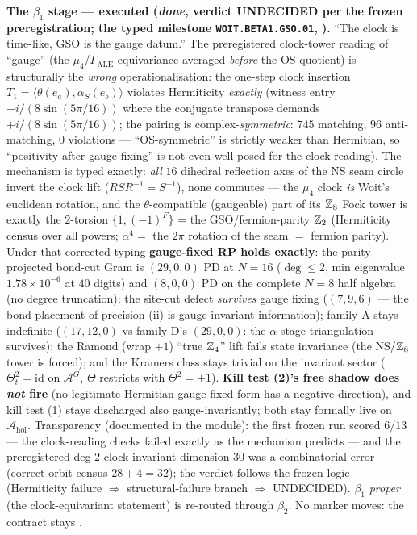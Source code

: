 \par\smallskip\noindent\textbf{The $\beta_1$ stage --- executed (\emph{done}, verdict UNDECIDED
per the frozen preregistration; the typed milestone \texttt{WOIT.BETA1.GSO.01},
).} ``The clock is time-like, GSO is the gauge datum.''
The preregistered clock-tower reading of ``gauge'' (the $\mu_4$/$\Gamma_{\mathrm{ALE}}$
equivariance averaged \emph{before} the OS quotient) is structurally the \emph{wrong}
operationalisation: the one-step clock insertion
$T_1=\langle\theta(e_a),\alpha_S(e_b)\rangle$ violates Hermiticity \emph{exactly} (witness
entry $-i/(8\sin(5\pi/16))$ where the conjugate transpose demands $+i/(8\sin(5\pi/16))$; the
pairing is complex-\emph{symmetric}: $745$ matching, $96$ anti-matching, $0$ violations ---
``OS-symmetric'' is strictly weaker than Hermitian, so ``positivity after gauge fixing'' is
not even well-posed for the clock reading). The mechanism is typed exactly: \emph{all} $16$
dihedral reflection axes of the NS seam circle invert the clock lift ($RSR^{-1}=S^{-1}$), none
commutes --- the $\mu_4$ clock \emph{is} Woit's euclidean rotation, and the $\theta$-compatible
(gaugeable) part of its $\mathbb Z_8$ Fock tower is exactly the $2$-torsion $\{1,(-1)^F\}$ = the
GSO/fermion-parity $\mathbb Z_2$ (Hermiticity census over all powers; $\alpha^4=$ the $2\pi$ rotation
of the seam $=$ fermion parity). Under that corrected typing \textbf{gauge-fixed RP holds
exactly}: the parity-projected bond-cut Gram is $(29,0,0)$ PD at $N=16$ ($\deg\le2$, min
eigenvalue $1.78\times10^{-6}$ at $40$ digits) and $(8,0,0)$ PD on the complete $N=8$ half
algebra (no degree truncation); the site-cut defect \emph{survives} gauge fixing ($(7,9,6)$ ---
the bond placement of precision (ii) is gauge-invariant information); family A stays indefinite
($(17,12,0)$ vs family D's $(29,0,0)$: the $\alpha$-stage triangulation survives); the Ramond
(wrap $+1$) ``true $\mathbb Z_4$'' lift fails state invariance (the NS/$\mathbb Z_8$ tower is forced); and
the Kramers class stays trivial on the invariant sector ($\Theta_t^2=\mathrm{id}$ on
$\mathcal A^G$, $\Theta$ restricts with $\Theta^2=+1$). \textbf{Kill test (2)'s free shadow
does \emph{not} fire} (no legitimate Hermitian gauge-fixed form has a negative direction), and
kill test (1) stays discharged also gauge-invariantly; both stay formally live on
$\mathcal A_{\mathrm{hol}}$. Transparency (documented in the module): the first frozen run
scored $6/13$ --- the clock-reading checks failed exactly as the mechanism predicts --- and
the preregistered deg-$2$ clock-invariant dimension $30$ was a combinatorial error (correct
orbit census $28+4=32$); the verdict follows the frozen logic (Hermiticity failure
$\Rightarrow$ structural-failure branch $\Rightarrow$ UNDECIDED). $\beta_1$ \emph{proper}
(the clock-equivariant statement) is re-routed through $\beta_2$. No marker moves: the
contract stays \mO.

